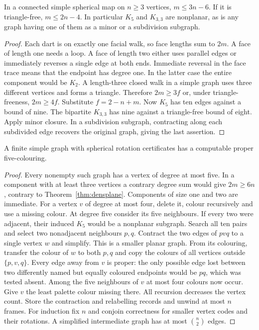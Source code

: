 \begin{theorem}\leavevmode\label{thm:densplane}
In a connected simple spherical map on $n\ge3$ vertices, $m\le3n-6$.
If it is triangle-free, $m\le 2n-4$. In particular $K_5$ and $K_{3,3}$ are
nonplanar, as is any graph having one of them as a minor or a subdivision
subgraph.
\end{theorem}
\begin{proof}
Each dart is on exactly one facial walk, so face lengths sum to $2m$.
A face of length one needs a loop. A face of length two either uses parallel
edges or immediately reverses a single edge at both ends. Immediate reversal
in the face trace means that the endpoint has degree one. In the latter case
the entire component would be $K_2$. A length-three closed walk in a simple
graph uses three different vertices and forms a triangle. Therefore
$2m\ge3f$ or, under triangle-freeness, $2m\ge4f$. Substitute $f=2-n+m$.
Now $K_5$ has ten edges against a bound of nine. The bipartite $K_{3,3}$
has nine against a triangle-free bound of eight. Apply minor closure.
In a subdivision subgraph, contracting along each subdivided edge recovers
the original graph, giving the last assertion.
\end{proof}

\begin{theorem}\leavevmode\label{thm:five}
A finite simple graph with spherical rotation certificates has a computable
proper five-colouring.
\end{theorem}
\begin{proof}
Every nonempty such graph has a vertex of degree at most five. In a component
with at least three vertices a contrary degree sum would give $2m\ge6n$,
contrary to Theorem~\ref{thm:densplane}. Components of size one and two
are immediate. For a vertex $v$ of degree at most four, delete it, colour
recursively and use a missing colour. At degree five consider its five
neighbours. If every two were adjacent, their induced $K_5$ would be a
nonplanar subgraph. Search all ten pairs and select two nonadjacent
neighbours $p,q$. Contract the two edges of $p v q$ to a single vertex
$w$ and simplify. This is a smaller planar graph. From its colouring,
transfer the colour of $w$ to both $p,q$ and copy the colours of all
vertices outside $\{p,v,q\}$. Every edge away from $v$ is proper: the
only possible edge lost between two differently named but equally coloured
endpoints would be $pq$, which was tested absent. Among the five neighbours
of $v$ at most four colours now occur. Give $v$ the least palette colour missing
there. All recursion decreases the vertex count. Store the contraction
and relabelling records and unwind at most $n$ frames. For induction fix
$n$ and conjoin correctness for smaller vertex codes and their rotations.
A simplified intermediate graph has at most $\binom n2$ edges.
\end{proof}

